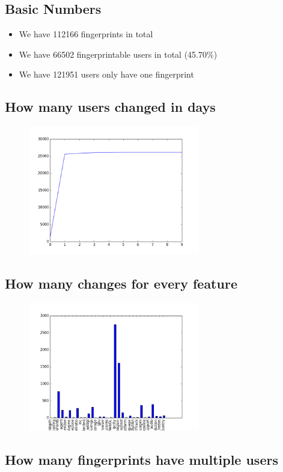 \documentclass[10pt, conference, compsocconf]{IEEEtran}
\begin{document}
\subsection{Basic Numbers}
\begin{itemize}\item We have 112166 fingerprints in total\item We have 66502 fingerprintable users in total (45.70\%)\item We have 121951 users only have one fingerprint \end{itemize}\subsection{How many users changed in days}
\begin{figure}[H]\centering\includegraphics[width=75mm,scale=0.5]{BasedonCookiechangebytime}\end{figure}\subsection{How many changes for every feature}
\begin{figure}[H]\centering\includegraphics[width=75mm,scale=0.5]{BasedonCookiefeaturechange}\end{figure}\subsection{How many fingerprints have multiple users}
\end{document}
